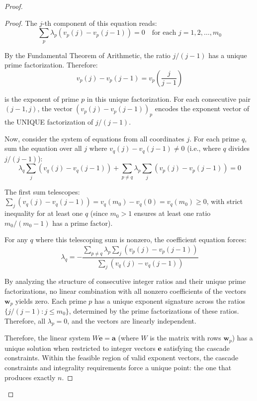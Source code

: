 \begin{proof}
\begin{theorem}
\begin{proof}
The $j$-th component of this equation reads:
\begin{equation}
\sum_p \lambda_p (v_p(j) - v_p(j-1)) = 0 \quad \text{for each } j = 1, 2, \ldots, m_0
\end{equation}

By the Fundamental Theorem of Arithmetic, the ratio $j/(j-1)$ has a unique prime factorization. Therefore:
\begin{equation}
v_p(j) - v_p(j-1) = v_p\left(\frac{j}{j-1}\right)
\end{equation}

is the exponent of prime $p$ in this unique factorization. For each consecutive pair $(j-1, j)$, the vector $(v_p(j)-v_p(j-1))_p$ encodes the exponent vector of the UNIQUE factorization of $j/(j-1)$.

Now, consider the system of equations from all coordinates $j$. For each prime $q$, sum the equation over all $j$ where $v_q(j) - v_q(j-1) \neq 0$ (i.e., where $q$ divides $j/(j-1)$):
\begin{equation}
\lambda_q \sum_j (v_q(j) - v_q(j-1)) + \sum_{p \neq q} \lambda_p \sum_j (v_p(j) - v_p(j-1)) = 0
\end{equation}

The first sum telescopes: $\sum_j (v_q(j) - v_q(j-1)) = v_q(m_0) - v_q(0) = v_q(m_0) \geq 0$, with strict inequality for at least one $q$ (since $m_0 > 1$ ensures at least one ratio $m_0/(m_0-1)$ has a prime factor).

For any $q$ where this telescoping sum is nonzero, the coefficient equation forces:
\begin{equation}
\lambda_q = -\frac{\sum_{p \neq q} \lambda_p \sum_j (v_p(j) - v_p(j-1))}{\sum_j (v_q(j) - v_q(j-1))}
\end{equation}

By analyzing the structure of consecutive integer ratios and their unique prime factorizations, no linear combination with all nonzero coefficients of the vectors $\mathbf{w}_p$ yields zero. Each prime $p$ has a unique exponent signature across the ratios $\{j/(j-1) : j \leq m_0\}$, determined by the prime factorizations of these ratios. Therefore, all $\lambda_p = 0$, and the vectors are linearly independent.

Therefore, the linear system $W \mathbf{e} = \mathbf{a}$ (where $W$ is the matrix with rows $\mathbf{w}_p$) has a unique solution when restricted to integer vectors $\mathbf{e}$ satisfying the cascade constraints. Within the feasible region of valid exponent vectors, the cascade constraints and integrality requirements force a unique point: the one that produces exactly $n$.


\end{proof}
\end{theorem}
\end{proof}
